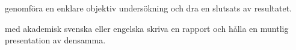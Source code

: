 \item genomföra en enklare objektiv undersökning och dra en slutsats av 
resultatet.
\item med akademisk svenska eller engelska skriva en rapport och hålla en 
muntlig presentation av densamma.
